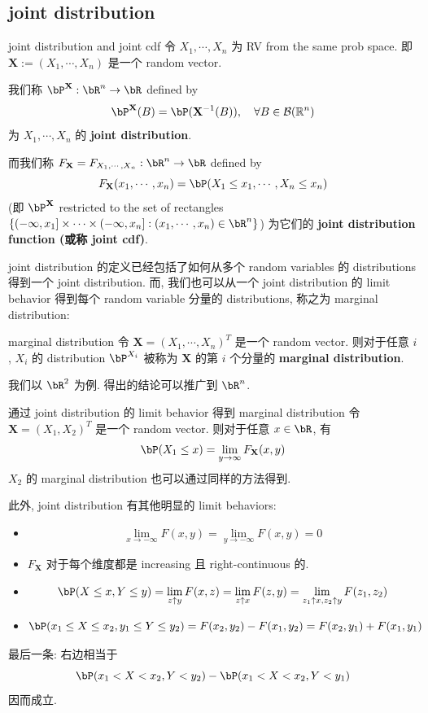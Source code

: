 \subsection{joint distribution}
\begin{definition}{joint distribution and joint cdf}
    令 \(X_1,\cdots, X_n\) 为 RV from the same prob space. 
    即 \(\mathbf{X}:= (X_1,\cdots, X_n)\) 
    是一个 random vector.

    我们称 \(\bP^{\mathbf{X}}: \bR^n \to \bR\) defined by 
    $$\bP^{\mathbf{X}}(B) = \bP(\mathbf{X}^{-1}(B)), \quad \forall B \in \mathcal{B}(\mathbb{R}^n)$$
    为 \(X_1, \cdots, X_n\) 的 \textbf{joint distribution}.
    
    而我们称 \(F_{\mathbf{X}} = F_{X_1,
    \cdots, X_n}: 
    \bR^n \to \bR\) defined by   
     \[
    F_{\mathbf{X}}(x_1,\cdots,x_n) = \bP(X_1 \leq x_1, \cdots, X_n \leq x_n)
    \]
     (即 \(\bP^{\mathbf{X}}\) restricted to the set of rectangles
     \(\{(-\infty, x_1] \times \cdots \times (-\infty, x_n]: (x_1,\cdots,x_n) \in \bR^n\}\))
    为它们的 \textbf{joint distribution function (或称 joint cdf)}.
\end{definition}
joint distribution 的定义已经包括了如何从多个 random variables 的 distributions
得到一个 joint distribution.
而, 我们也可以从一个 joint distribution 的 limit behavior 
得到每个 random variable 分量的 distributions, 称之为 marginal distribution:
\begin{definition}{marginal distribution}
    令 \(\mathbf{X} = (X_1, \cdots, X_n)^T\) 是一个 random vector. 
    则对于任意 \(i\), \(X_i\) 的 distribution \(\bP^{X_i}\) 
    被称为 \(\mathbf{X}\) 的第 \(i\) 个分量的 \textbf{marginal distribution}.
\end{definition}
我们以 \(\bR^2\) 为例. 得出的结论可以推广到 \(\bR^n\).
\begin{proposition}{通过 joint distribution 的 limit behavior 得到 marginal distribution}
    令 \(\mathbf{X} = (X_1, X_2)^T\) 是一个 random vector. 
    则对于任意 \(x\in \bR\), 有
    \[\bP(X_1 \leq x) = \lim_{y\to \infty} F_{\mathbf{X}}(x,y)\]
    \(X_2\) 的 marginal distribution 也可以通过同样的方法得到.

    此外, joint distribution 有其他明显的 limit behaviors:
    \begin{itemize}
        \item \[ \lim_{x\to -\infty}F(x,y) = \lim_{y\to -\infty}F(x,y) = 0 \]
        \item \(F_{\mathbf{X}}\) 对于每个维度都是 increasing 且 right-continuous 的.
        \item \[ \bP(X\leq x, Y \leq y) = \lim_{z\uparrow y} F(x,z) = \lim_{z\uparrow x} F(z,y) = \lim_{z_1\uparrow x, z_2 \uparrow y}F(z_1, z_2) \]
        \item \[ \bP(x_1 \leq X \leq x_2, y_1 \leq Y \leq y_2) = F(x_2,y_2) - F(x_1,y_2) = F(x_2,y_1)+F(x_1,y_1) \]
    \end{itemize}
\end{proposition}
\begin{remark}
    最后一条: 右边相当于 
    \[
    \bP(x_1 < X < x_2, Y < y_2) - \bP(x_1 < X < x_2, Y < y_1) 
    \]
    因而成立.
\end{remark}

